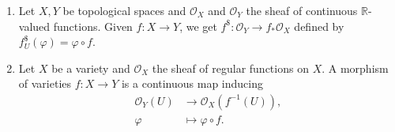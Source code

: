 \begin{enumerate}
	\item Let $X, Y$ be topological spaces and $\mathcal{O}_X$ and $\mathcal{O}_Y$
		the sheaf of continuous $\mathbb{R}$-valued functions. Given $f\colon X\to Y$,
		we get $f^\$\colon \mathcal{O}_Y\to f_*\mathcal{O}_X$ defined by
		$f_U^\$(\varphi) = \varphi \circ f$.
	\item Let $X$ be a variety and $\mathcal{O}_X$ the sheaf of regular functions
		on $X$. A morphism of varieties $f\colon X\to Y$ is a continuous map
		inducing
		\begin{align*}
			\mathcal{O}_Y(U) &\to \mathcal{O}_X(f^{-1}(U)),\\
			\varphi&\mapsto \varphi \circ f.
		\end{align*}
\end{enumerate}
